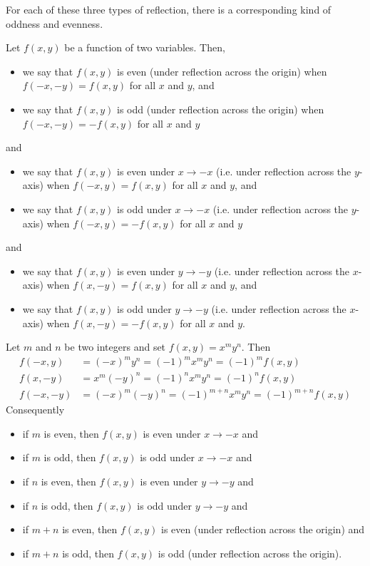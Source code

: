 For each of these three types of reflection, there is a corresponding kind of 
oddness and evenness.

\begin{defn}\label{def_evenodd_two_variables}
  Let $f(x,y)$ be a function of two variables. Then,
 \begin{itemize}
  \item we say that $f(x,y)$ is even (under reflection across the origin) 
    when $f(-x,-y)=f(x,y)$ for all $x$ and $y$, and
  \item we say that $f(x,y)$ is odd (under reflection across the origin) 
     when $f(-x,-y)=-f(x,y)$ for all $x$ and $y$
 \end{itemize}
and
 \begin{itemize}
  \item we say that $f(x,y)$ is even under $x\rightarrow -x$ (i.e. under           
         reflection across the $y$-axis) when $f(-x,y)=f(x,y)$ for all $x$ 
         and $y$, and
  \item we say that $f(x,y)$ is odd  under $x\rightarrow -x$ (i.e. under           
         reflection across the $y$-axis) when $f(-x,y)=-f(x,y)$ for all $x$ 
         and $y$
 \end{itemize}
and
 \begin{itemize}
  \item we say that $f(x,y)$ is even under $y\rightarrow -y$ (i.e. under           
         reflection across the $x$-axis) when $f(x,-y)=f(x,y)$ for all $x$ 
         and $y$, and
  \item we say that $f(x,y)$ is odd  under $y\rightarrow -y$ (i.e. under           
         reflection across the $x$-axis) when $f(x,-y)=-f(x,y)$ for all $x$ 
         and $y$.
 \end{itemize}
\end{defn}

\begin{eg}\label{eg_evenodd_two_variables}
Let $m$ and $n$ be two integers and set $f(x,y)=x^m y^n$. Then
\begin{align*}
f(-x,y)&= (-x)^my^n = (-1)^m x^m y^n = (-1)^m f(x,y) \\
f(x,-y)&= x^m(-y)^n = (-1)^n x^m y^n= (-1)^n f(x,y) \\
f(-x,-y)&= (-x)^m(-y)^n = (-1)^{m+n} x^m y^n = (-1)^{m+n} f(x,y) 
\end{align*}
Consequently
\begin{itemize}
\item if $m$ is even, then $f(x,y)$ is even under $x\rightarrow -x$ and
\item if $m$ is odd, then $f(x,y)$ is odd under $x\rightarrow -x$ and
\item if $n$ is even, then $f(x,y)$ is even under $y\rightarrow -y$ and
\item if $n$ is odd, then $f(x,y)$ is odd under $y\rightarrow -y$ and
\item if $m+n$ is even, then $f(x,y)$ is even  (under reflection across the origin) and
\item if $m+n$ is odd, then $f(x,y)$ is odd  (under reflection across the origin).
\end{itemize}
\end{eg}

